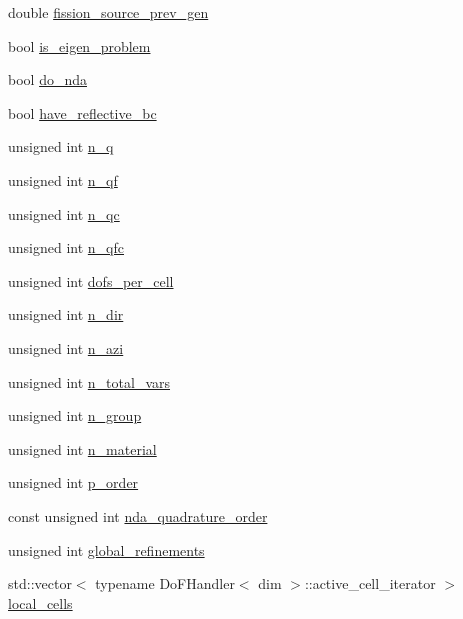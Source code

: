 \begin{DoxyCompactItemize}
\item 
double \hyperlink{class_equation_base_aac7587c6cd96b508a52f1ed4782b4806}{fission\+\_\+source\+\_\+prev\+\_\+gen}
\item 
bool \hyperlink{class_equation_base_a749f717dadd0df287fd0c366a7a8e0c1}{is\+\_\+eigen\+\_\+problem}
\item 
bool \hyperlink{class_equation_base_a908f21db148a15d7d51a8508aa1fc58a}{do\+\_\+nda}
\item 
bool \hyperlink{class_equation_base_a145ca193add91b43e7a00d6f35c0e1fb}{have\+\_\+reflective\+\_\+bc}
\item 
unsigned int \hyperlink{class_equation_base_a8b8a299e37005a06a089ace9f473f94e}{n\+\_\+q}
\item 
unsigned int \hyperlink{class_equation_base_ad0bad2bd155657e65a923910e5b114aa}{n\+\_\+qf}
\item 
unsigned int \hyperlink{class_equation_base_a001c60e6c8df319b9f267688f84471da}{n\+\_\+qc}
\item 
unsigned int \hyperlink{class_equation_base_a5cb013018da03250a101941f196df23b}{n\+\_\+qfc}
\item 
unsigned int \hyperlink{class_equation_base_a66b4cac3e416505fba70789599a98d14}{dofs\+\_\+per\+\_\+cell}
\item 
unsigned int \hyperlink{class_equation_base_a7f01312245816bc60e1cf0a1630030a2}{n\+\_\+dir}
\item 
unsigned int \hyperlink{class_equation_base_a006861508fc71350aee8274fd949b1e6}{n\+\_\+azi}
\item 
unsigned int \hyperlink{class_equation_base_a505c44d58215a614d263615a53159fda}{n\+\_\+total\+\_\+vars}
\item 
unsigned int \hyperlink{class_equation_base_adf5fc09a70820108fd273b0e2183db55}{n\+\_\+group}
\item 
unsigned int \hyperlink{class_equation_base_a6eba5e7408331bce23945068cba4ed19}{n\+\_\+material}
\item 
unsigned int \hyperlink{class_equation_base_a0facd1cc5977e32b301a134ed5b9fa98}{p\+\_\+order}
\item 
const unsigned int \hyperlink{class_equation_base_aafed438df52a6a2adca972fad322dd7b}{nda\+\_\+quadrature\+\_\+order}
\item 
unsigned int \hyperlink{class_equation_base_a9433f3e6cb2251b0b7d0408570677b2e}{global\+\_\+refinements}
\item 
std\+::vector$<$ typename Do\+F\+Handler$<$ dim $>$\+::active\+\_\+cell\+\_\+iterator $>$ \hyperlink{class_equation_base_a60d687f69ae6fd56881c15435e91e4e5}{local\+\_\+cells}

\end{DoxyCompactItemize}
